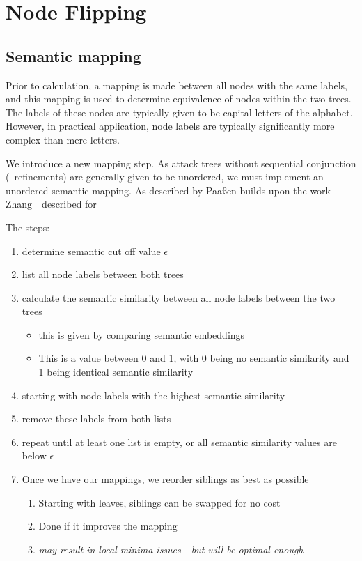 \section{Node Flipping}







\subsection{Semantic mapping}

Prior to calculation, a mapping is made between all nodes with the same labels, and this mapping is used to determine equivalence of nodes within the two trees. The labels of these nodes are typically given to be capital letters of the alphabet. However, in practical application, node labels are typically significantly more complex than mere letters.

We introduce a new mapping step. As attack trees without sequential conjunction (\SAND\ refinements) are generally given to be unordered, we must implement an unordered semantic mapping. As described by Paa{\ss}en builds upon the work Zhang~\etal\ described for

The steps:
\begin{enumerate}
    \item determine semantic cut off value $\epsilon$
    \item list all node labels between both trees
    \item calculate the semantic similarity between all node labels between the two trees
          \begin{itemize}
              \item this is given by comparing semantic embeddings
              \item This is a value between 0 and 1, with 0 being no semantic similarity and 1 being identical semantic similarity
          \end{itemize}
    \item starting with node labels with the highest semantic similarity
    \item remove these labels from both lists
    \item repeat until at least one list is empty, or all semantic similarity values are below $\epsilon$
\item Once we have our mappings, we reorder siblings as best as possible
\begin{enumerate}
    \item Starting with leaves, siblings can be swapped for no cost
    \item Done if it improves the mapping
    \item \textit{may result in local minima issues - but will be optimal enough}
\end{enumerate}
\end{enumerate}